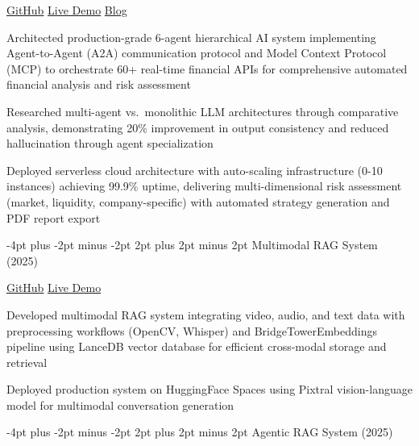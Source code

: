 \documentclass[10pt]{article}
\makeatletter
\providecommand{\tightlist}{%
  \setlength{\itemsep}{0pt}\setlength{\parskip}{0pt}}
\let\olditemize\itemize
\let\endolditemize\enditemize
\renewenvironment{itemize}{%
  \olditemize
  \setlength{\itemsep}{1pt}
  \setlength{\parskip}{0pt}
  \setlength{\parsep}{0pt}
  \setlength{\topsep}{2pt}
  \setlength{\partopsep}{0pt}
}{%
  \endolditemize
}
\renewcommand\subsubsection{\@startsection{subsubsection}{3}{\z@}%
  {-4pt plus -2pt minus -2pt}%
  {2pt plus 2pt minus 2pt}%
  {\normalfont\normalsize\bfseries}}
\makeatother
\begin{document}
\href{https://github.com/daddyofadoggy/financial_advisor}{GitHub}
\textbar{} \href{https://financial-advisor-r4ixiexwla-ue.a.run.app}{Live
Demo} \textbar{}
\href{https://daddyofadoggy.github.io/blog/posts/RiskNavigator/}{Blog}

\begin{itemize}
\tightlist
\item
  Architected production-grade 6-agent hierarchical AI system
  implementing Agent-to-Agent (A2A) communication protocol and Model
  Context Protocol (MCP) to orchestrate 60+ real-time financial APIs for
  comprehensive automated financial analysis and risk assessment
\item
  Researched multi-agent vs.~monolithic LLM architectures through
  comparative analysis, demonstrating 20\% improvement in output
  consistency and reduced hallucination through agent specialization
\item
  Deployed serverless cloud architecture with auto-scaling
  infrastructure (0-10 instances) achieving 99.9\% uptime, delivering
  multi-dimensional risk assessment (market, liquidity,
  company-specific) with automated strategy generation and PDF report
  export
\end{itemize}

\subsubsection{Multimodal RAG System
(2025)}\label{multimodal-rag-system-2025}

\href{https://github.com/daddyofadoggy/multimodal-rag}{GitHub}
\textbar{}
\href{https://huggingface.co/spaces/doggdad/multimodal-rag}{Live Demo}

\begin{itemize}
\tightlist
\item
  Developed multimodal RAG system integrating video, audio, and text data with preprocessing workflows (OpenCV, Whisper) and BridgeTowerEmbeddings pipeline using LanceDB vector database for efficient cross-modal storage and retrieval
\item
  Deployed production system on HuggingFace Spaces using Pixtral vision-language model for multimodal conversation generation
\end{itemize}

\subsubsection{Agentic RAG System (2025)}\label{agentic-rag-system-2025}
\end{document}
